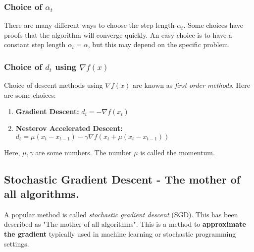 \subsubsection{Choice of $\alpha_t$}
There are many different ways to choose the step length $\alpha_t$.  Some choices have proofs that the algorithm will converge quickly.  An easy choice is to have a constant step length $\alpha_t = \alpha$, but this may depend on the specific problem.

\subsubsection{Choice of $d_t$ using $\nabla f(x)$}
Choice of descent methods using $\nabla f(x)$ are known as \emph{first order methods}.
Here are some choices:
\begin{enumerate}
\item \textbf{Gradient Descent:}   $d_t = - \nabla f(x_t)$
\item \textbf{Nesterov Accelerated Descent:} $d_t = \mu (x_t - x_{t-1}) - \gamma \nabla f(x_t + \mu(x_t- x_{t-1}))$
\end{enumerate}
Here, $\mu, \gamma$ are some numbers.  The number $\mu$ is called the momentum.  

\subsection{Stochastic Gradient Descent - The mother of all algorithms.}
 A popular method is called \emph{stochastic gradient descent} (SGD).   This has been described as "The mother of all algorithms".  
 This is a method to \textbf{approximate the gradient} typically used in machine learning or stochastic programming settings.  
 
